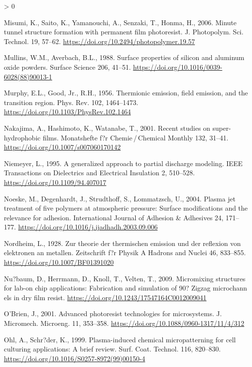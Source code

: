 \documentclass[
  11pt,
  twoside]{article}
\newlength{\cslhangindent}
\newenvironment{CSLReferences}[2] %
 {%
  \setlength{\parindent}{0pt}
  \ifodd #1 \everypar{\setlength{\hangindent}{\cslhangindent}}\ignorespaces\fi
  \ifnum #2 > 0
  \setlength{\parskip}{#2\baselineskip}
  \fi
 }%
 {}
\begin{document}
\begin{CSLReferences}{1}{0}
\leavevmode\hypertarget{ref-TOK06-2}{}%
Misumi, K., Saito, K., Yamanouchi, A., Senzaki, T., Honma, H., 2006. Minute tunnel structure formation with permanent film photoresist. J. Photopolym. Sci. Technol. 19, 57--62. \url{https://doi.org/10.2494/photopolymer.19.57}

\leavevmode\hypertarget{ref-Mull1988}{}%
Mullins, W.M., Averbach, B.L., 1988. Surface properties of silicon and aluminum oxide powders. Surface Science 206, 41--51. \url{https://doi.org/10.1016/0039-6028(88)90013-1}

\leavevmode\hypertarget{ref-Murp1956}{}%
Murphy, E.L., Good, Jr., R.H., 1956. Thermionic emission, field emission, and the transition region. Phys. Rev. 102, 1464--1473. \url{https://doi.org/10.1103/PhysRev.102.1464}

\leavevmode\hypertarget{ref-Naka01}{}%
Nakajima, A., Hashimoto, K., Watanabe, T., 2001. Recent studies on super-hydrophobic films. Monatshefte f?r Chemie / Chemical Monthly 132, 31--41. \url{https://doi.org/10.1007/s007060170142}

\leavevmode\hypertarget{ref-Niem1995}{}%
Niemeyer, L., 1995. A generalized approach to partial discharge modeling. IEEE Transactions on Dielectrics and Electrical Insulation 2, 510--528. \url{https://doi.org/10.1109/94.407017}

\leavevmode\hypertarget{ref-Noes04}{}%
Noeske, M., Degenhardt, J., Strudthoff, S., Lommatzsch, U., 2004. Plasma jet treatment of five polymers at atmospheric pressure: Surface modifications and the relevance for adhesion. International Journal of Adhesion \& Adhesives 24, 171--177. \url{https://doi.org/10.1016/j.ijadhadh.2003.09.006}

\leavevmode\hypertarget{ref-Nord1928}{}%
Nordheim, L., 1928. Zur theorie der thermischen emission und der reflexion von elektronen an metallen. Zeitschrift f?r Physik A Hadrons and Nuclei 46, 833--855. \url{https://doi.org/10.1007/BF01391020}

\leavevmode\hypertarget{ref-Nuss09}{}%
Nu?baum, D., Herrmann, D., Knoll, T., Velten, T., 2009. Micromixing structures for lab-on chip applications: Fabrication and simulation of 90? Zigzag microchann els in dry film resist. \url{https://doi.org/10.1243/17547164C0012009041}

\leavevmode\hypertarget{ref-Obri01}{}%
O'Brien, J., 2001. Advanced photoresist technologies for microsystems. J. Micromech. Microeng. 11, 353--358. \url{https://doi.org/10.1088/0960-1317/11/4/312}

\leavevmode\hypertarget{ref-Ohl1999}{}%
Ohl, A., Schr?der, K., 1999. Plasma-induced chemical micropatterning for cell culturing applications: A brief review. Surf. Coat. Technol. 116, 820--830. \url{https://doi.org/10.1016/S0257-8972(99)00150-4}


\end{CSLReferences}
\end{document}
